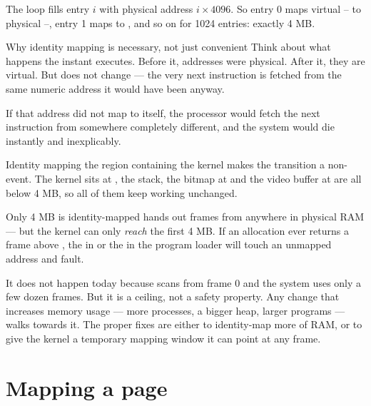The loop fills entry $i$ with physical address $i \times 4096$. So entry 0 maps virtual
-- to physical --, entry 1 maps  to
, and so on for 1024 entries: exactly 4 MB.

\begin{concept}{Why identity mapping is necessary, not just convenient}
Think about what happens the instant  executes. Before it, addresses were physical.
After it, they are virtual. But  does not change --- the very next instruction is fetched
from the same numeric address it would have been anyway.

If that address did not map to itself, the processor would fetch the next instruction from
somewhere completely different, and the system would die instantly and inexplicably.

Identity mapping the region containing the kernel makes the transition a non-event. The kernel sits
at , the stack, the bitmap at  and the video buffer at  are all
below 4 MB, so all of them keep working unchanged.
\end{concept}

\begin{danger}{Only 4 MB is identity-mapped}
 hands out frames from anywhere in physical RAM --- but the kernel can only
\emph{reach} the first 4 MB. If an allocation ever returns a frame above , the
 in  or the  in the program loader will touch an
unmapped address and fault.

It does not happen today because  scans from frame 0 and the system uses only a
few dozen frames. But it is a ceiling, not a safety property. Any change that increases memory
usage --- more processes, a bigger heap, larger programs --- walks towards it. The proper fixes are
either to identity-map more of RAM, or to give the kernel a temporary mapping window it can point
at any frame.
\end{danger}

\section{Mapping a page}

